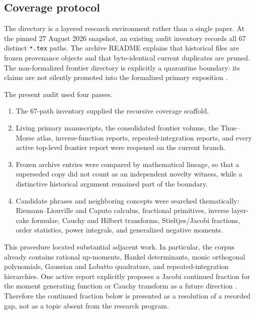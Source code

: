 \documentclass[11pt,oneside]{article}
\theoremstyle{definition}
\theoremstyle{remark}
\newcommand{\1}{\mathbf 1}
\begin{document}
\subsection{Coverage protocol}

The directory \repo{} is a layered research environment rather than a single
paper.  At the pinned 27 August 2026 snapshot, an existing audit inventory
records all 67 distinct \texttt{*.tex} paths.  The archive README explains that
historical files are frozen provenance objects and that byte-identical current
duplicates are pruned.  The non-formalized frontier directory is explicitly a
quarantine boundary: its claims are not silently promoted into the formalized
primary exposition \cite{p8:proveitArchive,p8:proveitFrontierReadme,p8:proveitNewton}.

The present audit used four passes.
\begin{enumerate}
\item The 67-path inventory supplied the recursive coverage scaffold.
\item Living primary manuscripts, the consolidated frontier volume, the
      Thue--Morse atlas, inverse-function reports, repeated-integration reports,
      and every active top-level frontier report were reopened on the current
      branch.
\item Frozen archive entries were compared by mathematical lineage, so that a
      superseded copy did not count as an independent novelty witness, while a
      distinctive historical argument remained part of the boundary.
\item Candidate phrases and neighboring concepts were searched thematically:
      Riemann--Liouville and Caputo calculus, fractional primitives, inverse
      layer-cake formulae, Cauchy and Hilbert transforms, Stieltjes/Jacobi
      fractions, order statistics, power integrals, and generalized negative
      moments.
\end{enumerate}

This procedure located substantial adjacent work.  In particular, the corpus
already contains rational up-moments, Hankel determinants, monic orthogonal
polynomials, Gaussian and Lobatto quadrature, and repeated-integration
hierarchies.  One active report explicitly proposes a Jacobi continued fraction
for the moment generating function or Cauchy transform as a future direction
\cite{p8:proveitQuadrature}.  Therefore the continued fraction below is presented
as a resolution of a recorded gap, not as a topic absent from the research
program.
\end{document}
